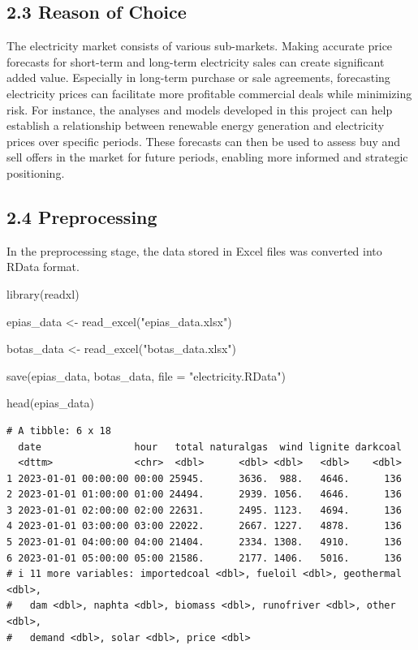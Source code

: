\documentclass[
  11pt,
  a4paper,
]{article}
\newenvironment{Shaded}{\begin{snugshade}}{\end{snugshade}}
\newcommand{\AttributeTok}[1]{\textcolor[rgb]{0.40,0.45,0.13}{#1}}
\newcommand{\FunctionTok}[1]{\textcolor[rgb]{0.28,0.35,0.67}{#1}}
\newcommand{\NormalTok}[1]{\textcolor[rgb]{0.00,0.23,0.31}{#1}}
\newcommand{\OtherTok}[1]{\textcolor[rgb]{0.00,0.23,0.31}{#1}}
\newcommand{\StringTok}[1]{\textcolor[rgb]{0.13,0.47,0.30}{#1}}
\begin{document}
\subsection{2.3 Reason of Choice}\label{reason-of-choice}

The electricity market consists of various sub-markets. Making accurate
price forecasts for short-term and long-term electricity sales can
create significant added value. Especially in long-term purchase or sale
agreements, forecasting electricity prices can facilitate more
profitable commercial deals while minimizing risk. For instance, the
analyses and models developed in this project can help establish a
relationship between renewable energy generation and electricity prices
over specific periods. These forecasts can then be used to assess buy
and sell offers in the market for future periods, enabling more informed
and strategic positioning.

\subsection{2.4 Preprocessing}\label{preprocessing}

In the preprocessing stage, the data stored in Excel files was converted
into RData format.

\begin{Shaded}
\begin{Highlighting}[]
\FunctionTok{library}\NormalTok{(readxl)}

\NormalTok{epias\_data }\OtherTok{\textless{}{-}} \FunctionTok{read\_excel}\NormalTok{(}\StringTok{"epias\_data.xlsx"}\NormalTok{)}

\NormalTok{botas\_data }\OtherTok{\textless{}{-}} \FunctionTok{read\_excel}\NormalTok{(}\StringTok{"botas\_data.xlsx"}\NormalTok{)}

\FunctionTok{save}\NormalTok{(epias\_data, botas\_data, }\AttributeTok{file =} \StringTok{"electricity.RData"}\NormalTok{)}

\FunctionTok{head}\NormalTok{(epias\_data)}
\end{Highlighting}
\end{Shaded}

\begin{verbatim}
# A tibble: 6 x 18
  date                hour   total naturalgas  wind lignite darkcoal
  <dttm>              <chr>  <dbl>      <dbl> <dbl>   <dbl>    <dbl>
1 2023-01-01 00:00:00 00:00 25945.      3636.  988.   4646.      136
2 2023-01-01 01:00:00 01:00 24494.      2939. 1056.   4646.      136
3 2023-01-01 02:00:00 02:00 22631.      2495. 1123.   4694.      136
4 2023-01-01 03:00:00 03:00 22022.      2667. 1227.   4878.      136
5 2023-01-01 04:00:00 04:00 21404.      2334. 1308.   4910.      136
6 2023-01-01 05:00:00 05:00 21586.      2177. 1406.   5016.      136
# i 11 more variables: importedcoal <dbl>, fueloil <dbl>, geothermal <dbl>,
#   dam <dbl>, naphta <dbl>, biomass <dbl>, runofriver <dbl>, other <dbl>,
#   demand <dbl>, solar <dbl>, price <dbl>
\end{verbatim}
\end{document}
